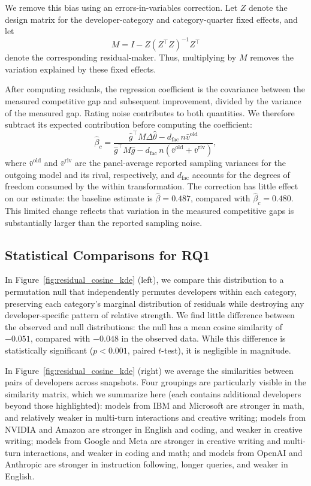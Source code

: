 We remove this bias using an errors-in-variables correction.
Let \(Z\) denote the design matrix for the developer-category and category-quarter
fixed effects, and let
\[
M = I-Z(Z^\top Z)^{-1}Z^\top
\]
denote the corresponding residual-maker. Thus, multiplying by \(M\) removes
the variation explained by these fixed effects.

After computing residuals, the regression coefficient is the covariance between
the measured competitive gap and subsequent improvement, divided by the
variance of the measured gap. 
Rating noise contributes to both quantities.
We therefore subtract its expected contribution before computing the
coefficient:
\[
\hat\beta_c
=
\frac{
\hat g^\top M\Delta\hat\theta
-
d_{\mathrm{fac}}\,n\bar v^{\mathrm{old}}
}{
\hat g^\top M\hat g
-
d_{\mathrm{fac}}\,n\left(\bar v^{\mathrm{old}}+\bar v^{\mathrm{riv}}\right)
},
\]
where \(\bar v^{\mathrm{old}}\) and \(\bar v^{\mathrm{riv}}\) are the panel-average reported sampling variances for the outgoing model and its rival, respectively, and \(d_{\mathrm{fac}}\) accounts for the degrees of freedom consumed by the within transformation.
The correction has little effect on our estimate:
the baseline estimate is \(\hat\beta=0.487\), compared with
\(\hat\beta_c=0.480\).
This limited change reflects that variation in the measured competitive gaps
is substantially larger than the reported sampling noise.

\subsection{Statistical Comparisons for RQ1}
\label{app:statistical_rq1}
In Figure~\ref{fig:residual_cosine_kde} (left), we compare this distribution to a permutation null that independently permutes developers within each category, preserving each category's marginal distribution of residuals while destroying any developer-specific pattern of relative strength. 
We find little difference between the observed and null distributions: the null has a mean cosine similarity of \(-0.051\), compared with \(-0.048\) in the observed data. 
While this difference is statistically significant (\(p<0.001\), paired \(t\)-test), it is negligible in magnitude.

In Figure~\ref{fig:residual_cosine_kde} (right) we average the similarities between pairs of developers across snapshots. 
Four groupings are particularly visible in the similarity matrix, which we summarize here (each contains additional developers beyond those highlighted): models from IBM and Microsoft are stronger in math, and relatively weaker in multi-turn interactions and creative writing; 
models from NVIDIA and Amazon are stronger in English and coding, and weaker in creative writing; 
models from Google and Meta are stronger in creative writing and multi-turn interactions, and weaker in coding and math;
and models from OpenAI and Anthropic are stronger in instruction following, longer queries, and weaker in English.

